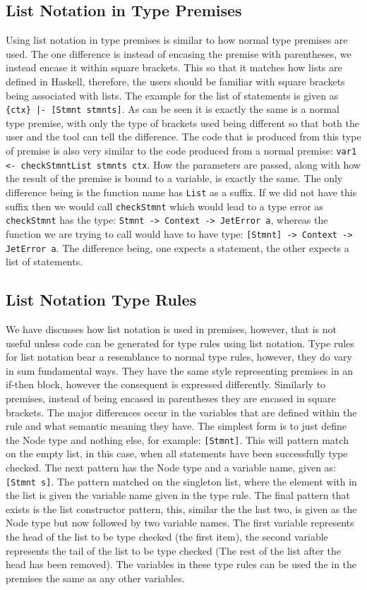 \subsection{List Notation in Type Premises}
Using list notation in type premises is similar to how normal type premises are used.
The one difference is instead of encasing the premise with parentheses, we instead encase it within square brackets.
This so that it matches how lists are defined in Haskell, therefore, the users should be familiar with square brackets being associated with lists.
The example for the list of statements is given as \texttt{\{ctx\} |- [Stmnt stmnts]}.
As can be seen it is exactly the same is a normal type premise, with only the type of brackets used being different so that both the user and the tool can tell the difference.
The code that is produced from this type of premise is also very similar to the code produced from a normal premise: \texttt{var1 <- checkStmntList stmnts ctx}.
How the parameters are passed, along with how the result of the premise is bound to a variable, is exactly the same.
The only difference being is the function name has \texttt{List} as a suffix.
If we did not have this suffix then we would call \texttt{checkStmnt} which would lead to a type error as \texttt{checkStmnt} has the type: \texttt{Stmnt -> Context -> JetError a}, whereas the function we are trying to call would have to have type: \texttt{[Stmnt] -> Context -> JetError a}.
The difference being, one expects a statement, the other expects a list of statements.

\subsection{List Notation Type Rules}
We have discusses how list notation is used in premises, however, that is not useful unless code can be generated for type rules using list notation.
Type rules for list notation bear a resemblance to normal type rules, however, they do vary in sum fundamental ways.
They have the same style representing premises in an if-then block, however the consequent is expressed differently.
Similarly to premises, instead of being encased in parentheses they are encased in square brackets.
The major differences occur in the variables that are defined within the rule and what semantic meaning they have.
The simplest form is to just define the Node type and nothing else, for example: \texttt{[Stmnt]}.
This will pattern match on the empty list, in this case, when all statements have been successfully type checked.
The next pattern has the Node type and a variable name, given as: \texttt{[Stmnt s]}.
The pattern matched on the singleton list, where the element with in the list is given the variable name given in the type rule.
The final pattern that exists is the list constructor pattern, this, similar the the last two,  is given as the Node type but now followed by two variable names.
The first variable represents the head of the list to be type checked (the first item), the second variable represents the tail of the list to be type checked (The rest of the list after the head has been removed).
The variables in these type rules can be used the in the premises the same as any other variables.

